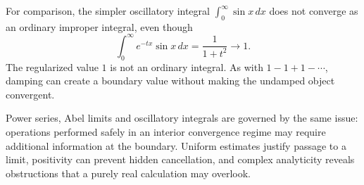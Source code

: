 For comparison, the simpler oscillatory integral \(\int_0^\infty\sin x\,dx\) does not converge as an ordinary improper integral, even though
\[
 \int_0^\infty e^{-tx}\sin x\,dx=\frac1{1+t^2}\longrightarrow1.
\]
The regularized value \(1\) is not an ordinary integral. As with \(1-1+1-\cdots\), damping can create a boundary value without making the undamped object convergent.

Power series, Abel limits and oscillatory integrals are governed by the same issue: operations performed safely in an interior convergence regime may require additional information at the boundary. Uniform estimates justify passage to a limit, positivity can prevent hidden cancellation, and complex analyticity reveals obstructions that a purely real calculation may overlook.

